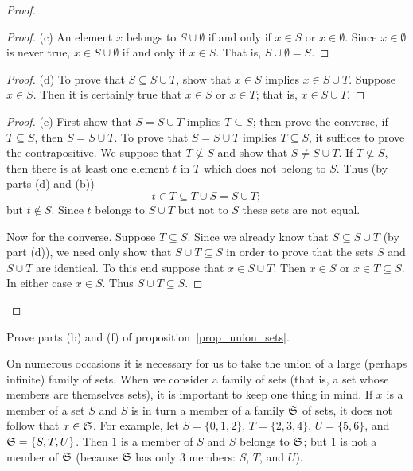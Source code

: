 \begin{proof}
\begin{proof} (c) An element $x$ belongs to $S \cup \emptyset$ if and only if $x \in S$ or
$x \in \emptyset$.  Since $x \in \emptyset$ is never true, $x \in S \cup \emptyset$ if and
only if $x \in S$. That is, $S \cup \emptyset = S$. \ns\end{proof}

\begin{proof} (d)  To prove that $S \subseteq S \cup T$, show that $x \in S$ implies
$x \in S \cup T$.  Suppose $x \in S$.  Then it is certainly true that $x \in S$ or $x \in T$;
that is, $x \in S \cup T$. \ns\end{proof}

\begin{proof} (e) First show that $S = S \cup T$ implies $T \subseteq S$; then prove the converse,
if $T \subseteq S$, then $S = S \cup T$.  To prove that $S = S \cup T$ implies $T \subseteq
S$, it suffices to prove the contrapositive.  We suppose that $T \not\subseteq S$ and show
that $S \ne S \cup T$.  If $T \not\subseteq S$, then there is at least one element $t$ in $T$
which does not belong to $S$.  Thus (by parts (d) and (b))
   \[t \in T  \subseteq T \cup S  =  S \cup T;\]
but $t \notin S$. Since $t$ belongs to $S \cup T$ but not to $S$ these sets are not equal.

Now for the converse.  Suppose $T \subseteq S$.  Since we already know that $S \subseteq S
\cup T$ (by part (d)), we need only show that $S \cup T \subseteq S$ in order to prove that
the sets $S$ and $S \cup T$ are identical.  To this end suppose that $x \in S \cup T$.  Then
$x \in S$ or $x \in T \subseteq S$. In either case $x \in S$. Thus $S \cup T \subseteq S$.
\ns\end{proof}\end{proof}

\begin{prob} Prove parts (b) and (f) of proposition~\ref{prop_union_sets}.
\end{prob}

On numerous occasions it is necessary for us to take the union of a large (perhaps
infinite) family of sets.  When we consider a family of sets (that is, a set whose
members are themselves sets), it is important to keep one thing in mind.  If $x$ is a
member of a set $S$ and $S$ is in turn a member of a family $\mathfrak{S}$ of sets, it does
not follow that $x \in \mathfrak{S}$.  For example, let $S = \{0, 1, 2\}$, $T = \{2, 3, 4\}$,
$U = \{5, 6\}$, and $\mathfrak{S} = \{S, T, U\}$.  Then $1$ is a member of $S$ and $S$ belongs
to $\mathfrak{S}$; but $1$ is not a member of $\mathfrak{S}$ (because $\mathfrak{S}$ has only 3 members:
$S$, $T$, and $U$).


